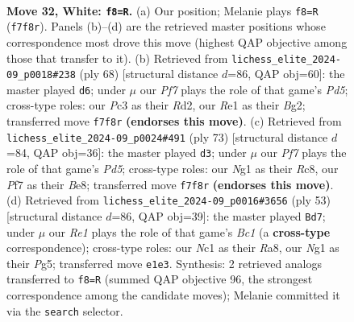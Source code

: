\documentclass[11pt]{article}
\begin{document}
\begin{figure}[p]\centering
\begin{subfigure}{0.46\textwidth}\centering
\resizebox{\linewidth}{!}{%
\newchessgame
\chessboard[
  setfen={1r6/4rPk1/ppn5/2p1pbp1/P7/2P2P2/1K4PP/2N1RBNR w - - 2 32},
  showmover=false,
  pgfstyle=straightmove, color=movearrow, markmove={f7-f8}
]}
\caption{}
\end{subfigure}\hfill
\begin{subfigure}{0.46\textwidth}\centering
\resizebox{\linewidth}{!}{%
\newchessgame
\chessboard[
  setfen={1r1r4/p3n1pp/8/N1PPkp2/bP2p3/P5P1/3R1PBP/4R1K1 w - - 0 35},
  showmover=false,
  pgfstyle=straightmove, color=movearrow, markmove={d5-d6}
]}
\caption{}
\end{subfigure}
\\[4pt]
\begin{subfigure}{0.46\textwidth}\centering
\resizebox{\linewidth}{!}{%
\newchessgame
\chessboard[
  setfen={2r1b2r/kp1n1pN1/p3p3/4P3/2ppR3/P6P/1PB2PNK/1R6 b - - 1 37},
  showmover=false,
  pgfstyle=straightmove, color=movearrow, markmove={d4-d3}
]}
\caption{}
\end{subfigure}\hfill
\begin{subfigure}{0.46\textwidth}\centering
\resizebox{\linewidth}{!}{%
\newchessgame
\chessboard[
  setfen={r1b2rk1/1p6/2p4p/3p1Pp1/p2P2Pn/3BN3/PP3R1K/4R3 b - - 1 27},
  showmover=false,
  pgfstyle=straightmove, color=movearrow, markmove={c8-d7}
]}
\caption{}
\end{subfigure}
\caption{\textbf{Move 32, White: \texttt{f8=R}.} (a) Our position; Melanie plays \texttt{f8=R} (\texttt{f7f8r}). Panels (b)--(d) are the retrieved master positions whose correspondence most drove this move (highest QAP objective among those that transfer to it). (b) Retrieved from \texttt{lichess\_elite\_2024-09\_p0018\#238} (ply 68) [structural distance $d$=86, QAP obj=60]: the master played \texttt{d6}; under $\mu$ our \emph{Pf7} plays the role of that game's \emph{Pd5}; cross-type roles: our \emph{P}c3 as their \emph{R}d2, our \emph{R}e1 as their \emph{B}g2; transferred move \texttt{f7f8r} \textbf{(endorses this move)}. (c) Retrieved from \texttt{lichess\_elite\_2024-09\_p0024\#491} (ply 73) [structural distance $d$=84, QAP obj=36]: the master played \texttt{d3}; under $\mu$ our \emph{Pf7} plays the role of that game's \emph{Pd5}; cross-type roles: our \emph{N}g1 as their \emph{R}c8, our \emph{P}f7 as their \emph{B}e8; transferred move \texttt{f7f8r} \textbf{(endorses this move)}. (d) Retrieved from \texttt{lichess\_elite\_2024-09\_p0016\#3656} (ply 53) [structural distance $d$=86, QAP obj=39]: the master played \texttt{Bd7}; under $\mu$ our \emph{Re1} plays the role of that game's \emph{Bc1} (a \textbf{cross-type} correspondence); cross-type roles: our \emph{N}c1 as their \emph{R}a8, our \emph{N}g1 as their \emph{P}g5; transferred move \texttt{e1e3}. Synthesis: 2 retrieved analogs transferred to \texttt{f8=R} (summed QAP objective 96, the strongest correspondence among the candidate moves); Melanie committed it via the \texttt{search} selector.}
\label{fig:thought-m62}
\end{figure}
\end{document}
